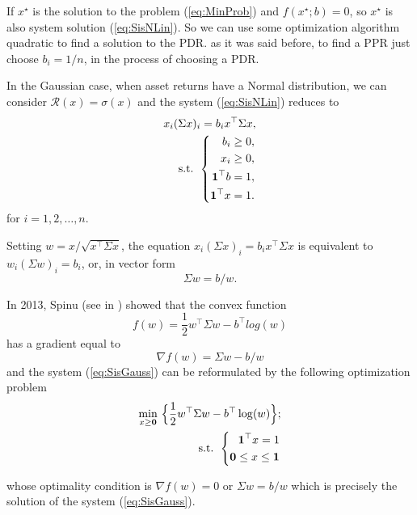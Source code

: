 If $x^\star$ is the solution to the problem (\ref{eq:MinProb}) and
$f(x^\star;b)=0$, so $x^\star$ is also system solution
(\ref{eq:SisNLin}). So we can use some optimization algorithm
quadratic to find a solution to the PDR. as it was
said before, to find a PPR just choose $b_i=1/n$, in the
process of choosing a PDR.

In the Gaussian case, when asset returns have a Normal distribution, we can consider $\mathcal{R}(x)=\sigma(x)$ and the system (\ref{eq:SisNLin}) reduces to
\begin{eqnarray}\label{eq:SisGauss}
x_i (\Sigma x )_i = b_i x^\top \Sigma x,\\
	\mbox{s.t. }\left\{
	\begin{aligned}\nonumber
b_i \geq 0, \\
x_i \geq 0, \\
{\bf 1}^\top b =1, \\
{\bf 1}^\top x =1.
	\end{aligned}
	\right.
\end{eqnarray}
for $i=1,2,\dots,n$.


Setting $w=x/\sqrt{x^\top \Sigma x}$, the equation $x_i (\Sigma x )_i = b_i x^\top \Sigma x$ is equivalent to $w_i(\Sigma w)_i =b_i$, or, in vector form
\[
\Sigma w = b/w.
\]

In 2013, Spinu (see in \cite{Spinu2013}) showed that the convex function
\[
f(w)= \frac{1}{2}w^\top \Sigma w - b^\top log(w)
\]
has a gradient equal to
\[
\nabla f(w) = \Sigma w - b/w
\]
and the system (\ref{eq:SisGauss}) can be reformulated by the following optimization problem
\begin{eqnarray}\label{eq:GaussProb}
\min_{x\geq {\bf 0}}\,\Big\{\frac{1}{2}w^\top \Sigma w - b^\top \log(w)\Big\};  \\
	\mbox{s.t. }\left\{
	\begin{aligned}\nonumber
		\mathbf{1}^\top x=1 & \\
		\mathbf{0}\leq x \leq \mathbf{1}
	\end{aligned}
	\right.
\end{eqnarray}


whose optimality condition is $\nabla f(w) = 0$ or $\Sigma w = b/w$ which is precisely the solution of the system (\ref{eq:SisGauss}).




